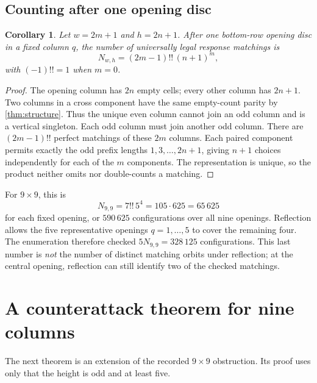 \documentclass[11pt]{article}
\newtheorem{corollary}[theorem]{Corollary}
\theoremstyle{definition}
\theoremstyle{remark}
\begin{document}
\subsection[Counting after one opening]{Counting after one opening disc}
\begin{corollary}\label{cor:count}
Let $w=2m+1$ and $h=2n+1$. After one bottom-row opening disc in a fixed
column $q$, the number of universally legal response matchings is
\begin{equation}\label{eq:count}
 N_{w,h}=(2m-1)!!\,(n+1)^m,
\end{equation}
with $(-1)!!=1$ when $m=0$.
\end{corollary}
\begin{proof}
The opening column has $2n$ empty cells; every other column has $2n+1$.
Two columns in a cross component have the same empty-count parity by
\cref{thm:structure}. Thus the unique even column cannot join an odd
column and is a vertical singleton. Each odd column must join another odd
column. There are $(2m-1)!!$ perfect matchings of these $2m$ columns.
Each paired component permits exactly the odd prefix lengths
$1,3,\ldots,2n+1$, giving $n+1$ choices independently for each of the $m$
components. The representation is unique, so the product neither omits nor
double-counts a matching.
\end{proof}

For $9\times9$, this is
\[
 N_{9,9}=7!!\,5^4=105\cdot625=65\,625
\]
for each fixed opening, or $590\,625$ configurations over all nine openings.
Reflection allows the five representative openings $q=1,\ldots,5$ to cover
the remaining four. The enumeration therefore checked
$5N_{9,9}=328\,125$ configurations. This last number is \emph{not} the
number of distinct matching orbits under reflection; at the central opening,
reflection can still identify two of the checked matchings.

\section[Counterattack obstruction]{A counterattack theorem for nine columns}\label{sec:obstruction}
The next theorem is an extension of the recorded $9\times9$ obstruction.
Its proof uses only that the height is odd and at least five.
\end{document}
